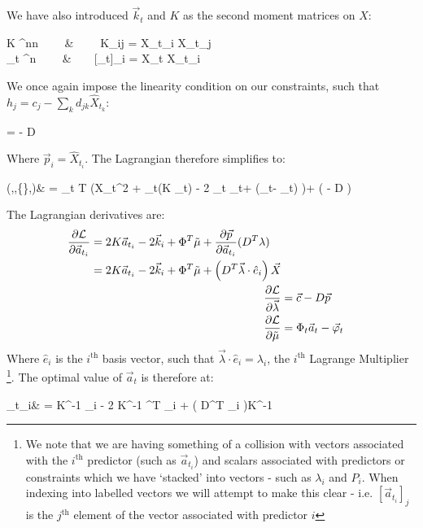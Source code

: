 \documentclass[]{article}
\def\llangle{\left\langle}
\def\rrangle{\right\rangle}
\newcommand\E[1]{\llangle #1 \rrangle}
\def\a{\vec{a}_t}
\def\ai{\vec{a}_{t_i}}
\begin{document}
		We have also introduced $\vec{k}_t$ and $K$ as the second moment matrices on $X$:
		\begin{spalign}
			K \in {}^{n\times n} ~~~~&~~~~ K_{ij} = \E{X_{t_i} X_{t_j}}
			\\
			_t \in {}^n ~~~~&~~~~[_t]_i = \E{X_t X_{t_i}}
		\end{spalign}
		We once again impose the linearity condition on our constraints, such that $h_j = c_j - \sum_k d_{jk} \hat{X}_{t_k}$:
		\begin{spalign}
			 =  - D \vec{p}
		\end{spalign}
		Where $_i = \hat{X}_{t_i}$. The Lagrangian therefore simplifies to:
		\begin{spalign}
			(,\vec{\lambda},\{\tilde{\mu}\},)& = \sum_{t \in T} \left(\E{X_t^2} + \a \cdot (K \a) - 2 _t \cdot \a + \tilde{\mu} \cdot \left(\Phi\a - \vec{\varphi}_t\right) \right)+ \vec{\lambda} \cdot \left(  - D  \right)
		\end{spalign}
		The Lagrangian derivatives are:
		\begin{align}
			\begin{split}
			\pdiv{\mathcal{L}}{\ai} & = 2 K \ai - 2 \vec{k}_i + \Phi^T \tilde{\mu} +   \pdiv{\vec{p}}{\ai}(D^T\lambda)
			\\
			& = 2 K \ai - 2  \vec{k}_i + \Phi^T \tilde{\mu} + \left( D^T\vec{\lambda} \cdot \hat{e}_i \right) \vec{X}
			\end{split}
			\\\label{E:CLUP_Constraint}
			\pdiv{\mathcal{L}}{\vec{\lambda}} & =\vec{c} - D\vec{p}
			\\
			\pdiv{\mathcal{L}}{\tilde{\mu}} & = \Phi_t \a - \vec{\varphi}_t \label{E:CLUP_Unbiased}
		\end{align}
		Where $\hat{e}_i$ is the $i^\text{th}$ basis vector, such that $\vec{\lambda} \cdot \hat{e}_i = \lambda_i$, the $i^\text{th}$ Lagrange Multiplier \footnote{We note that we are having something of a collision with vectors associated with the $i^\text{th}$ predictor (such as $\ai$) and scalars associated with predictors or constraints which we have `stacked' into vectors - such as $\lambda_i$ and $P_i$. When indexing into labelled vectors we will attempt to make this clear - i.e. $[\ai]_j$ is the $j^\text{th}$ element of the vector associated with predictor $i$}.	The optimal value of $\a$ is therefore at:
		\def\vl{\vec{\lambda}}
		\def\ki{\vec{k}_i}
		\def\Kinv{K^{-1}}
		\def\X{\vec{X}}
		\begin{spalign}
			\ai & = K^{-1} _i - 2 K^{-1} \Phi^T \tilde{\mu}_i +  \left( D^T\vec{\lambda} \cdot {}_i \right)K^{-1} \label{E:CLUP_a}
		\end{spalign}
\end{document}
